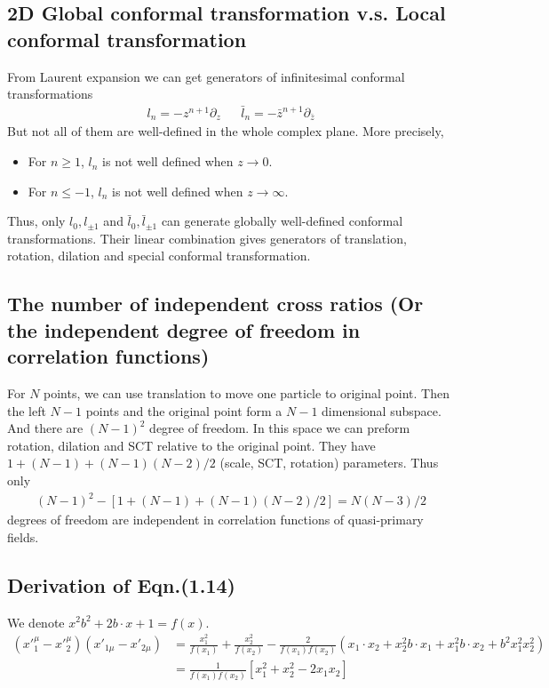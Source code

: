 \documentclass[letterpaper,12pt]{article}
\theoremstyle{definition}
\theoremstyle{remark}
\begin{document}
\subsection{2D Global conformal transformation v.s. Local conformal transformation}
From Laurent expansion we can get generators of infinitesimal conformal transformations
\begin{align}
    l_{n}=-z^{n+1}\partial_{z} & {} & \bar{l}_{n}=-\bar{z}^{n+1}\partial_{\bar{z}}
\end{align}
But not all of them are well-defined in the whole complex plane. More precisely,
\begin{itemize}
    \item For $n\geq 1$, $l_{n}$ is not well defined when $z\to0$.
    \item For $n\leq -1$, $l_{n}$ is not well defined when $z\to\infty$.
\end{itemize}
Thus, only $l_{0},l_{\pm1}$ and $\bar{l}_{0},\bar{l}_{\pm1}$ can generate globally well-defined conformal transformations. Their linear combination gives generators of translation, rotation, dilation and special conformal transformation. 

\subsection{The number of independent cross ratios (Or the independent degree of freedom in correlation functions)}
For $N$ points, we can use translation to move one particle to original point. Then the left $N-1$ points and the original point form a $N-1$ dimensional subspace. And there are $(N-1)^2$ degree of freedom. In this space we can preform rotation, dilation and SCT relative to the original point. They have $1+(N-1)+(N-1)(N-2)/2$ (scale, SCT, rotation) parameters. Thus only
\begin{align}
    (N-1)^2-[1+(N-1)+(N-1)(N-2)/2]=N(N-3)/2
\end{align}
degrees of freedom are independent in correlation functions of quasi-primary fields.
\subsection{Derivation of Eqn.(1.14)}
We denote $x^2b^2+2b\cdot x+1=f(x)$.
\begin{align}
    (x'^{\mu}_{1}-x'^{\mu}_2)(x'_{1\mu}-x'_{2\mu})&=\frac{x^2_1}{f(x_1)}+\frac{x^2_2}{f(x_2)}-\frac{2}{f(x_1)f(x_2)}(x_1\cdot x_2+x_2^2 b\cdot x_1+x_1^2 b\cdot x_2+b^2 x_1^2x_2^2)\\
    &=\frac{1}{f(x_1)f(x_2)}\left[ x^2_1+x_2^2-2x_1x_2 \right]
\end{align}
\end{document}
